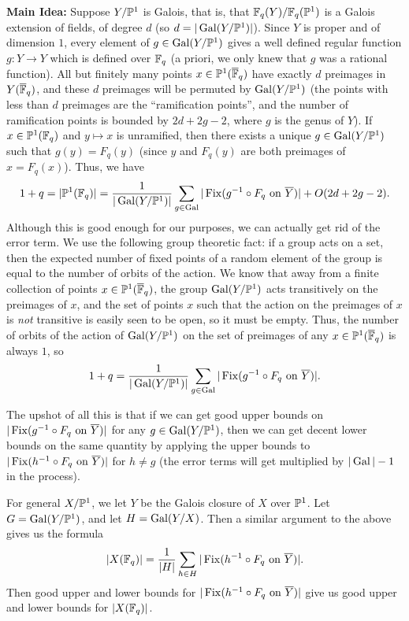 {\bf Main Idea:} Suppose $Y/\mathbb{P}^1$ is Galois, that is, that $\mathbb{F}_q(Y)/\mathbb{F}_q(\mathbb{P}^1)$ is a Galois extension of fields, of degree $d$ (so $d = |\operatorname{Gal}(Y/\mathbb{P}^1)|$). Since $Y$ is proper and of dimension $1$, every element of $g \in \operatorname{Gal}(Y/\mathbb{P}^1)$ gives a well defined regular function $g: Y \rightarrow Y$ which is defined over $\mathbb{F}_q$ (a priori, we only knew that $g$ was a rational function). All but finitely many points $x \in \mathbb{P}^1(\overline{\mathbb{F}}_q)$ have exactly $d$ preimages in $Y(\overline{\mathbb{F}}_q)$, and these $d$ preimages will be permuted by $\operatorname{Gal}(Y/\mathbb{P}^1)$ (the points with less than $d$ preimages are the ``ramification points'', and the number of ramification points is bounded by $2d+2g-2$, where $g$ is the genus of $Y$). If $x \in \mathbb{P}^1(\mathbb{F}_q)$ and $y \mapsto x$ is unramified, then there exists a unique $g \in \operatorname{Gal}(Y/\mathbb{P}^1)$ such that $g(y) = F_q(y)$ (since $y$ and $F_q(y)$ are both preimages of $x = F_q(x)$). Thus, we have
\[
1 + q = |\mathbb{P}^1(\mathbb{F}_q)| = \frac{1}{|\operatorname{Gal}(Y/\mathbb{P}^1)|} \sum_{g \in \operatorname{Gal}} |\operatorname{Fix}(g^{-1}\circ F_q \text{ on }\overline{Y})| + O(2d+2g-2).
\]
Although this is good enough for our purposes, we can actually get rid of the error term. We use the following group theoretic fact: if a group acts on a set, then the expected number of fixed points of a random element of the group is equal to the number of orbits of the action. We know that away from a finite collection of points $x \in \mathbb{P}^1(\overline{\mathbb{F}}_q)$, the group $\operatorname{Gal}(Y/\mathbb{P}^1)$ acts transitively on the preimages of $x$, and the set of points $x$ such that the action on the preimages of $x$ is \emph{not} transitive is easily seen to be open, so it must be empty. Thus, the number of orbits of the action of $\operatorname{Gal}(Y/\mathbb{P}^1)$ on the set of preimages of any $x \in \mathbb{P}^1(\overline{\mathbb{F}}_q)$ is always $1$, so
\[
1 + q = \frac{1}{|\operatorname{Gal}(Y/\mathbb{P}^1)|} \sum_{g \in \operatorname{Gal}} |\operatorname{Fix}(g^{-1}\circ F_q \text{ on }\overline{Y})|.
\]

The upshot of all this is that if we can get good upper bounds on $|\operatorname{Fix}(g^{-1}\circ F_q \text{ on }\overline{Y})|$ for any $g \in \operatorname{Gal}(Y/\mathbb{P}^1)$, then we can get decent lower bounds on the same quantity by applying the upper bounds to $|\operatorname{Fix}(h^{-1}\circ F_q \text{ on }\overline{Y})|$ for $h \ne g$ (the error terms will get multiplied by $|\operatorname{Gal}|-1$ in the process).

For general $X/\mathbb{P}^1$, we let $Y$ be the Galois closure of $X$ over $\mathbb{P}^1$. Let $G = \operatorname{Gal}(Y/\mathbb{P}^1)$, and let $H = \operatorname{Gal}(Y/X)$. Then a similar argument to the above gives us the formula
\[
|X(\mathbb{F}_q)| = \frac{1}{|H|}\sum_{h \in H} |\operatorname{Fix}(h^{-1}\circ F_q \text{ on } \overline{Y})|.
\]
Then good upper and lower bounds for $|\operatorname{Fix}(h^{-1}\circ F_q \text{ on } \overline{Y})|$ give us good upper and lower bounds for $|X(\mathbb{F}_q)|$.

